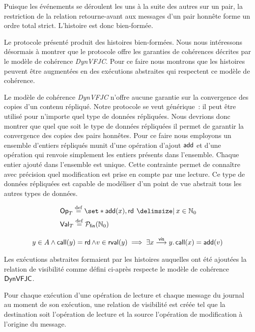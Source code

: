 Puisque les événements se déroulent les uns à la suite des autres sur un pair, la restriction de la relation retourne-avant aux messages d'un pair honnête forme un ordre total strict.
L'histoire est donc bien-formée.

Le protocole présenté produit des histoires bien-formées.
Nous nous intéressons désormais à montrer que le protocole offre les garanties de cohérences décrites par le modèle de cohérence \emph{DynVFJC}.
Pour ce faire nous montrons que les histoires peuvent être augmentées en des exécutions abstraites qui respectent ce modèle de cohérence.

Le modèle de cohérence \emph{DynVFJC} n'offre aucune garantie sur la convergence des copies d'un contenu répliqué.
Notre protocole se veut générique~: il peut être utilisé pour n'importe quel type de données répliquées.
Nous devrions donc montrer que quel que soit le type de données répliquées il permet de garantir la convergence des copies des pairs honnêtes.
Pour ce faire nous employons un ensemble d'entiers répliqués munit d'une opération d'ajout $\operatorname{\mathsf{add}}$ et d'une opération qui renvoie simplement les entiers présents dans l'ensemble.
Chaque entier ajouté dans l'ensemble est unique.
Cette contrainte permet de connaître avec précision quel modification est prise en compte par une lecture.
Ce type de données répliquées est capable de modéliser d'un point de vue abstrait tous les autres types de données.

\begin{align*}
    &\trm{Op}_T \defeq \set*{\trm{add}(x), \trm{rd} \given x \in \mathbb{N}_0}\\
    &\trm{Val}_T \defeq \powerfset{\mathbb{N}_0}
\end{align*}

\begin{equation*}
    y \in A \land \operatorname{\mathsf{call}}(y) = \operatorname{\mathsf{rd}} \land v \in \operatorname{\mathsf{rval}}(y) \implies \exists x \overset{\mathsf{vis}}{\longrightarrow} y \ldotp \operatorname{\mathsf{call}}(x) = \operatorname{\mathsf{add}}(v)
\end{equation*}

Les exécutions abstraites formaient par les histoires auquelles ont été ajoutées la relation de visibilité comme défini ci-après respecte le modèle de cohérence $\operatorname{\mathsf{DynVFJC}}$.

Pour chaque exécution d'une opération de lecture et chaque message du journal au moment de son exécution, une relation de visibilité est créée tel que la destination soit l'opération de lecture et la source l'opération de modification à l'origine du message.

